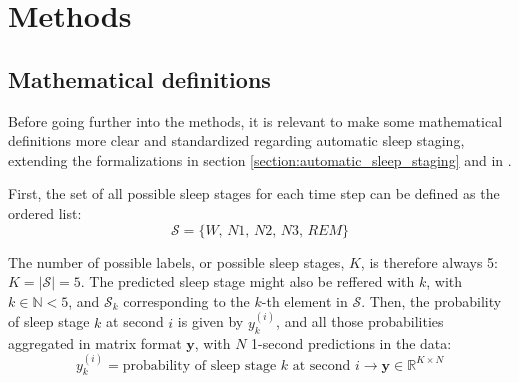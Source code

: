 \section{Methods}




\setcounter{subsection}{-1}
\subsection{Mathematical definitions}
\label{section:mathematical_definitions}
Before going further into the methods, it is relevant to make some mathematical definitions more clear and standardized regarding automatic sleep staging, extending the formalizations in section \ref{section:automatic_sleep_staging} and in \cite{Alexander2020}. 


First, the set of all possible sleep stages for each time step can be defined as the ordered list:
\begin{equation}
    \mathcal{S} = \{\textit{W, N1, N2, N3, REM}\}
\end{equation}

The number of possible labels, or possible sleep stages, $K$, is therefore always 5: $K = |\mathcal{S}| = 5$. The predicted sleep stage might also be reffered with $k$, with $k \in \mathbb{N} < 5$, and $\mathcal{S}_k$ corresponding to the $k$-th element in $\mathcal{S}$. Then, the probability of sleep stage $k$ at second $i$ is given by $y_k^{(i)}$, and all those probabilities aggregated in matrix format $\mathbf{y}$, with $N$ 1-second predictions in the data:
\begin{equation}
    y_k^{(i)} = \text{probability of sleep stage $k$ at second $i$} \rightarrow \mathbf{y} \in \mathbb{R}^{K \times N}
\end{equation}

